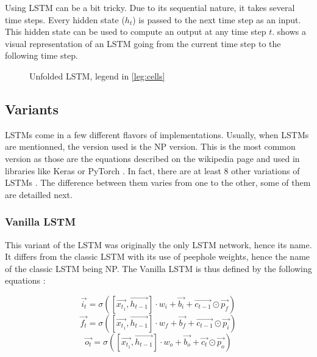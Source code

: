 Using \ac{LSTM} can be a bit tricky. Due to its sequential nature, it takes several time steps. Every hidden state ($h_t$) is passed to the next time step as an input. This hidden state can be used to compute an output at any time step $t$.  shows a visual representation of an \ac{LSTM} going from the current time step to the following time step.

\begin{figure}[H]
  \centering
  
  \caption{Unfolded \acs{LSTM}, legend in \cref{leg:cells}}
  \label{fig:lstmUse}
\end{figure}

\subsection{Variants}

\acp{LSTM} come in a few different flavors of implementations. Usually, when \acp{LSTM} are mentionned, the version used is the \ac{NP} version. This is the most common version as those are the equations described on the wikipedia page \cite{wikiLSTM} and used in libraries like Keras \cite{Keras} or PyTorch \cite{PyTorch}. In fact, there are at least 8 other variations of \acp{LSTM} \cite{nbLSTM}.
The difference between them varies from one to the other, some of them are detailled next.

\subsubsection{Vanilla \ac{LSTM}}
This variant of the \ac{LSTM} was originally the only \ac{LSTM} network, hence its name. It differs from the classic \ac{LSTM} with its use of peephole weights, hence the name of the classic \ac{LSTM} being \acl{NP}. The Vanilla \ac{LSTM} is thus defined by the following equations \cite{vanillaLSTM, nbLSTM} :

\begin{equation}\label{eq:inputGVanilla}
  \overrightarrow{i_t}=\sigma ([\overrightarrow{x_{t_1}},\overrightarrow{h_{t-1}}]\cdot w_i + \overrightarrow{b_i} +\overrightarrow{c_{t-1}}\odot \overrightarrow{p_f})
\end{equation}
\begin{equation}\label{eq:forgetGVanilla}
  \overrightarrow{f_t}=\sigma ([\overrightarrow{x_{t_1}},\overrightarrow{h_{t-1}}]\cdot w_f + \overrightarrow{b_f}+\overrightarrow{c_{t-1}}\odot \overrightarrow{p_i})
\end{equation}
\begin{equation}\label{eq:ouputGVanilla}
  \overrightarrow{o_t}=\sigma ([\overrightarrow{x_{t_1}},\overrightarrow{h_{t-1}}]\cdot w_o + \overrightarrow{b_o}+\overrightarrow{c_{t}}\odot \overrightarrow{p_o})
\end{equation}

